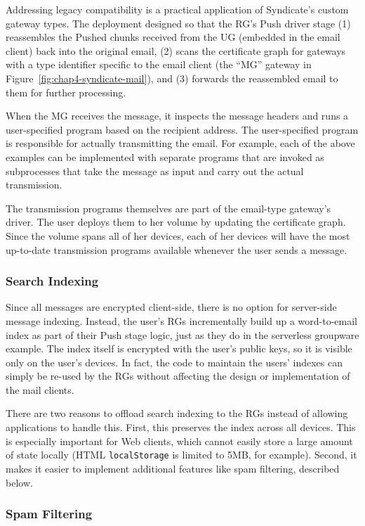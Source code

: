 Addressing legacy compatibility is a practical application of Syndicate's custom
gateway types.  The deployment designed so that the RG's
Push driver stage (1) reassembles the Pushed chunks received from the UG
(embedded in the email client) back into the original email, (2)
scans the certificate graph for gateways with a type identifier specific to the
email client (the ``MG'' gateway in Figure~\ref{fig:chap4-syndicate-mail}),
and (3) forwards the reassembled email to them for further
processing.

When the MG receives the message, it inspects the message
headers and runs a user-specified program based on the recipient address.  The
user-specified program is responsible for actually transmitting the email.
For example, each of the above examples can be implemented with separate
programs that are invoked as subprocesses that take the message as input and
carry out the actual transmission.

The transmission programs themselves are part of the email-type gateway's driver.  The user
deploys them to her volume by updating the certificate graph.  Since the volume
spans all of her devices, each of her devices will have the most up-to-date
transmission programs available whenever the user sends a message.

\subsubsection{Search Indexing}

Since all messages are encrypted client-side, there is no option for server-side
message indexing.  Instead, the user's RGs incrementally build up a
word-to-email index as part of their Push stage logic, just as they do in the
serverless groupware example.  The index itself is
encrypted with the user's public keys, so it is visible only on the user's devices. 
In fact, the code to maintain the users' indexes can simply be re-used by the
RGs without affecting the design or implementation of the mail clients.

There are two reasons to offload search indexing to the RGs instead of allowing
applications to handle this.  First, this preserves the index across all devices. 
This is especially important for Web clients, which cannot easily store a large amount of state
locally (HTML \texttt{localStorage} is limited to 5MB, for example).  Second, it
makes it easier to implement additional features like spam filtering, described below.

\subsubsection{Spam Filtering}


